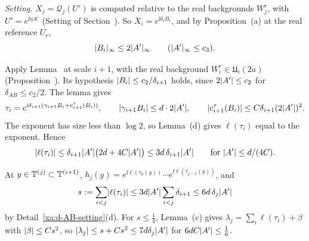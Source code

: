 \begin{detail}\label{xa:d-AB-rep}
\emph{Setting.} $X_j=\mathcal Q_j(U')$ is computed relative to the real backgrounds $W^r_j$, with $U'=e^{\ii\eta A'}$ (Setting of Section~). So $X_i=e^{\ii\delta_iB_i}$, and by Proposition~(a) at the real reference $U_r$,
\[
\lvert B_i\rvert_\infty\le2\lvert A'\rvert_\infty\qquad(\lvert A'\rvert_\infty\le c_3).
\]

\begin{step}
Apply Lemma~ at scale $i+1$, with the real background $W^r_i\in\mathfrak U_i(2a)$ (Proposition~). Its hypothesis $\lvert B_i\rvert\le c_2/\delta_{i+1}$ holds, since $2\lvert A'\rvert\le c_2$ for $\delta_{AB}\le c_2/2$. The lemma gives
\[
\tau_i=e^{\mathrm i\delta_{i+1}(\gamma_{i+1}B_i+c^\tau_{i+1}(B_i))},\qquad\lvert\gamma_{i+1}B_i\rvert\le d\cdot2\lvert A'\rvert,\qquad\lvert c^\tau_{i+1}(B_i)\rvert\le C\delta_{i+1}(2\lvert A'\rvert)^2 .
\]
The exponent has size less than $\log2$, so Lemma~(d) gives $\ell(\tau_i)$ equal to the exponent. Hence
\[
\lvert\ell(\tau_i)\rvert\le\delta_{i+1}\lvert A'\rvert\big(2d+4C\lvert A'\rvert\big)\le3d\,\delta_{i+1}\lvert A'\rvert\qquad\text{for }\lvert A'\rvert\le d/(4C).
\]
\end{step}

\begin{step}
At $y\in\mathbb T^{(j)}\subset\mathbb T^{(i+1)}$, $h_j(y)=e^{\ii\ell(\tau_0(y))}\cdots e^{\ii\ell(\tau_{j-1}(y))}$, and
\[
s:=\sum_{i<j}\lvert\ell(\tau_i)\rvert\le3d\lvert A'\rvert\sum_{i<j}\delta_{i+1}\le6d\,\delta_j\lvert A'\rvert
\]
by Detail~\ref{xa:d-AB-setting}(d). For $s\le\frac14$, Lemma~(c) gives $\lambda_j=\sum_i\ell(\tau_i)+\beta$ with $\lvert\beta\rvert\le Cs^2$, so $\lvert\lambda_j\rvert\le s+Cs^2\le7d\delta_j\lvert A'\rvert$ for $6dC\lvert A'\rvert\le\frac16$.
\end{step}


\end{detail}

